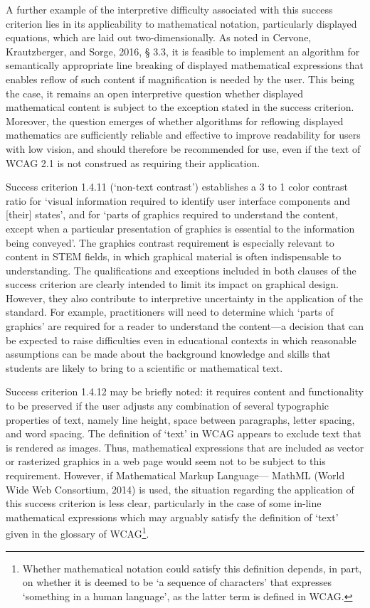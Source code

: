 \documentclass[11.5pt]{sig-alternate} %
\begin{document}
\begin{large}
A further example of the interpretive difficulty associated with this success criterion lies in its applicability to mathematical notation, particularly displayed equations, which are laid out two-dimensionally. As noted in Cervone, Krautzberger, and Sorge, 2016, § 3.3, it is feasible to implement an algorithm for semantically appropriate line breaking of displayed mathematical expressions that enables reflow of such content if magnification is needed by the user. This being the case, it remains an open interpretive question whether displayed mathematical content is subject to the exception stated in the success criterion. Moreover, the question emerges of whether algorithms for reflowing displayed mathematics are sufficiently reliable and effective to improve readability for users with low vision, and should therefore be recommended for use, even if the text of WCAG 2.1 is not construed as requiring their application.

Success criterion 1.4.11 (‘non-text contrast’) establishes a 3 to 1 color contrast ratio for ‘visual information required to identify user interface components and [their] states’, and for ‘parts of graphics required to understand the content, except when a particular presentation of graphics is essential to the information being conveyed’. The graphics contrast requirement is especially relevant to content in STEM fields, in which graphical material is often indispensable to understanding. The qualifications and exceptions included in both clauses of the success criterion are clearly intended to limit its impact on graphical design. However, they also contribute to interpretive uncertainty in the application of the standard. For example, practitioners will need to determine which ‘parts of graphics’ are required for a reader to understand the content—a decision that can be expected to raise difficulties even in educational contexts in which reasonable assumptions can be made about the background knowledge and skills that students are likely to bring to a scientific or mathematical text.

Success criterion 1.4.12 may be briefly noted: it requires content and functionality to be preserved if the user adjusts any combination of several typographic properties of text, namely line height, space between paragraphs, letter spacing, and word spacing. The definition of ‘text’ in WCAG appears to exclude text that is rendered as images. Thus, mathematical expressions that are included as vector or rasterized graphics in a web page would seem not to be subject to this requirement. However, if Mathematical Markup Language— MathML (World Wide Web Consortium, 2014) is used, the situation regarding the application of this success criterion is less clear, particularly in the case of some in-line mathematical expressions which may arguably satisfy the definition of ‘text’ given in the glossary of WCAG\footnote{Whether mathematical notation could satisfy this definition depends, in part, on whether it is deemed to be ‘a sequence of characters’ that expresses ‘something in a human language’, as the latter term is defined in WCAG.}. 


\end{large}
\end{document}
